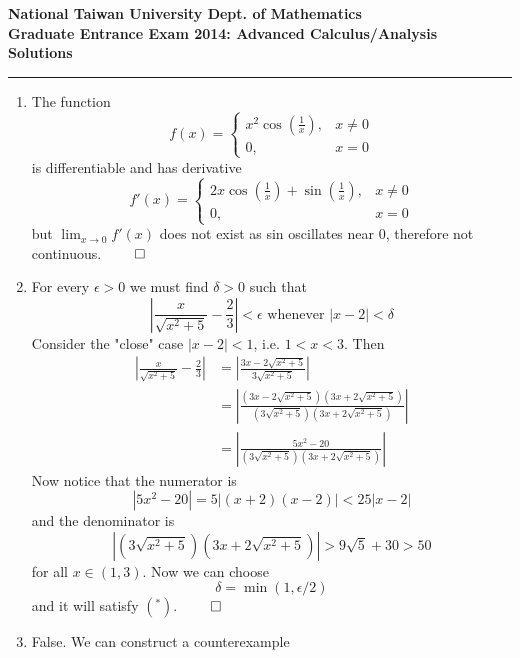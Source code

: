 
\begin{center}
    \textbf{National Taiwan University Dept. of Mathematics \\ Graduate Entrance Exam 2014: Advanced Calculus/Analysis \\ Solutions} 
    \noindent\rule{\textwidth}{0.4pt}
    \end{center}
    
    \begin{enumerate}
        \item The function
        \[
        f(x) =
        \begin{cases}
        x^2\cos(\frac{1}{x}), &x \neq 0 \\
        0, &x = 0
        \end{cases}
        \]
        is differentiable and has derivative
        \[
        f'(x) =
        \begin{cases}
        2x\cos(\frac{1}{x}) + \sin (\frac{1}{x}), &x \neq 0 \\
        0, &x = 0
        \end{cases}
        \]
        but $\lim_{x \to 0} f'(x)$ does not exist as sin oscillates near 0, therefore not continuous. $\qed$
        \item For every $\epsilon > 0$ we must find $\delta > 0$ such that
        \[
        \left\vert \frac{x}{\sqrt{x^2+5}} - \frac{2}{3} \right\vert < \epsilon \text{ whenever } |x - 2| < \delta	\tag{*}
        \]
        Consider the "close" case $|x - 2| < 1$, i.e. $1 < x < 3$. Then
        \begin{align*}
        \left\vert \frac{x}{\sqrt{x^2+5}} - \frac{2}{3} \right\vert &= \left\vert \frac{3x - 2\sqrt{x^2+5}}{3\sqrt{x^2+5}} \right\vert \\
        &= \left\vert \frac{(3x - 2\sqrt{x^2+5})(3x + 2\sqrt{x^2+5})}{(3\sqrt{x^2+5})(3x + 2\sqrt{x^2+5})} \right\vert \\
        &= \left\vert \frac{5x^2-20}{(3\sqrt{x^2+5})(3x + 2\sqrt{x^2+5})} \right\vert
        \end{align*}
        Now notice that the numerator is 
        \[
        |5x^2 - 20| = 5|(x+2)(x-2)| < 25 |x-2|
        \]
        and the denominator is
        \[
        |(3\sqrt{x^2+5})(3x + 2\sqrt{x^2+5})| > 9\sqrt{5} + 30 > 50
        \]
        for all $x \in (1,3)$. Now we can choose
        \[
        \delta = \min (1, \epsilon /2)	
        \]
        and it will satisfy $(^*)$.  $\qed$
        \item False. We can construct a counterexample
        \[
\]
\end{enumerate}
